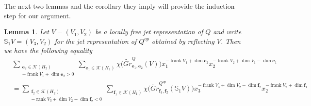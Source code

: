 \documentclass{amsart}
\numberwithin{equation}{section}
\newtheorem{lemma}[theorem]{Lemma}
\theoremstyle{definition}
\def\SS{\mathbb{S}}
\def\bfe{\mathbf{e}}
\def\bff{\mathbf{f}}
\def\cK{\mathcal{K}}
\def\dim{\operatorname{dim}}
\def\frank{\operatorname{frank}}
\def\rank{\operatorname{rank}}
\begin{document}
The next two lemmas and the corollary they imply will provide the induction step for our argument.
\begin{lemma}\label{le:reflection recursion 1}
  Let $V=(V_1,V_2)$ be a locally free jet representation of $Q$ and write $\SS_1V=(V_3,V_2)$ for the jet representation of $Q^{op}$ obtained by reflecting $V$.  Then we have the following equality
  \begin{align}\label{eq:reflection recursion 1}
    &\sum\limits_{\substack{\bfe_2\in\cK(H_2)\\-\frank V_1+\dim\bfe_2>0}}\sum\limits_{\bfe_1\in\cK(H_1)}\chi\big(\widetilde{Gr}^Q_{\bfe_1,\bfe_2}(V)\big)x_1^{-\frank V_1+\dim\bfe_2}x_2^{-\frank V_2+\dim V_1-\dim\bfe_1}\\
    \nonumber
    &\hspace{0in}=\sum\limits_{\substack{\bff_2\in\cK(H_2)\\-\rank V_3+\dim V_2-\dim\bff_2<0}}\sum\limits_{\bff_1\in\cK(H_1)}\chi\big(\widetilde{Gr}^{Q^{op}}_{\bff_1,\bff_2}(\SS_1 V)\big)x_3^{-\frank V_3+\dim V_2-\dim\bff_2}x_2^{-\frank V_2+\dim\bff_1}
  \end{align}
\end{lemma}
\end{document}

